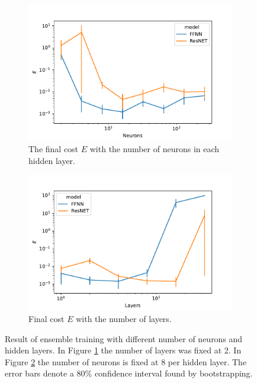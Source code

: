 \begin{figure}
    \begin{subfigure}[t]{0.5\textwidth}
        \centering
        \includegraphics[width=\linewidth]{figures/curve_1/eks_5/neurons_error.pdf}
        \caption{The final cost \(E\) with the number of neurons in each hidden layer.} \label{fig:curve_1_neuron_error} \end{subfigure}
    \begin{subfigure}[t]{0.5\textwidth}
        \centering
        \includegraphics[width=\linewidth]{figures/curve_1/eks_5/layer_error.pdf}
        \caption{Final cost \(E\) with the number of layers.} \label{fig:curve_1_layer_error}
    \end{subfigure}
    \caption{Result of ensemble training with different number of neurons and hidden layers. In Figure \ref{fig:curve_1_neuron_error} the number of layers was fixed at 2. In Figure \ref{fig:curve_1_layer_error} the number of neurons is fixed at 8 per hidden layer. The error bars denote a 80\% confidence interval found by bootstrapping.} \label{fig:curve_1_parmas_eks}
\end{figure}

